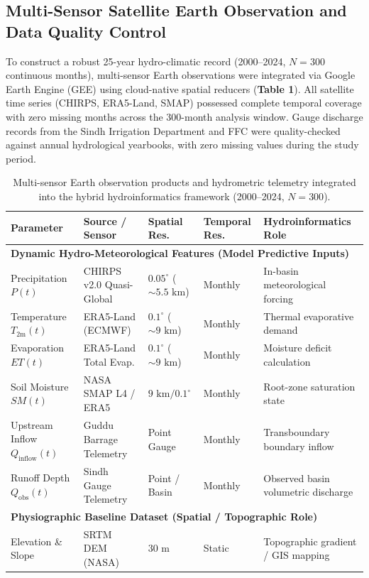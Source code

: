 \documentclass[11pt,a4paper,fleqn]{article}
\begin{document}
\subsection{Multi-Sensor Satellite Earth Observation and Data Quality Control}

To construct a robust 25-year hydro-climatic record (2000--2024, $N=300$ continuous months), multi-sensor Earth observations were integrated via Google Earth Engine (GEE) using cloud-native spatial reducers (\textbf{Table 1}). All satellite time series (CHIRPS, ERA5-Land, SMAP) possessed complete temporal coverage with zero missing months across the 300-month analysis window. Gauge discharge records from the Sindh Irrigation Department and FFC were quality-checked against annual hydrological yearbooks, with zero missing values during the study period.

\begin{table}[htbp]
\centering
\caption{Multi-sensor Earth observation products and hydrometric telemetry integrated into the hybrid hydroinformatics framework (2000--2024, $N=300$).}
\label{tab:datasets}
\small
\begin{tabular}{lllll}
\toprule
\textbf{Parameter} & \textbf{Source / Sensor} & \textbf{Spatial Res.} & \textbf{Temporal Res.} & \textbf{Hydroinformatics Role} \\
\midrule
\multicolumn{5}{l}{\textbf{Dynamic Hydro-Meteorological Features (Model Predictive Inputs)}} \\
Precipitation $P(t)$ & CHIRPS v2.0 Quasi-Global & $0.05^\circ$ ($\sim 5.5\text{ km}$) & Monthly & In-basin meteorological forcing \\
Temperature $T_{\text{2m}}(t)$ & ERA5-Land (ECMWF) & $0.1^\circ$ ($\sim 9\text{ km}$) & Monthly & Thermal evaporative demand \\
Evaporation $ET(t)$ & ERA5-Land Total Evap. & $0.1^\circ$ ($\sim 9\text{ km}$) & Monthly & Moisture deficit calculation \\
Soil Moisture $SM(t)$ & NASA SMAP L4 / ERA5 & $9\text{ km} / 0.1^\circ$ & Monthly & Root-zone saturation state \\
Upstream Inflow $Q_{\text{inflow}}(t)$ & Guddu Barrage Telemetry & Point Gauge & Monthly & Transboundary boundary inflow \\
Runoff Depth $Q_{\text{obs}}(t)$ & Sindh Gauge Telemetry & Point / Basin & Monthly & Observed basin volumetric discharge \\
\midrule
\multicolumn{5}{l}{\textbf{Physiographic Baseline Dataset (Spatial / Topographic Role)}} \\
Elevation \& Slope & SRTM DEM (NASA) & $30\text{ m}$ & Static & Topographic gradient / GIS mapping \\
\bottomrule
\end{tabular}
\end{table}
\end{document}
